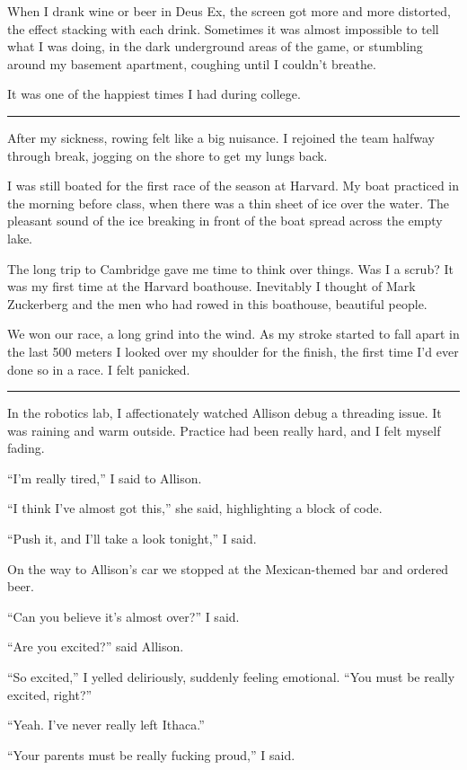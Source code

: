 When I drank wine or beer in Deus Ex, the screen got more and more distorted,
the effect stacking with each drink.  Sometimes it was almost impossible to tell
what I was doing, in the dark underground areas of the game, or stumbling around
my basement apartment, coughing until I couldn't breathe.

It was one of the happiest times I had during college.

\plainfancybreak{12pt}{2}{* * *}

After my sickness, rowing felt like a big nuisance.  I rejoined the team halfway
through break, jogging on the shore to get my lungs back.  

I was still boated for the first race of the season at Harvard.  My boat
practiced in the morning before class, when there was a thin sheet of ice over
the water.   The pleasant sound of the ice breaking in front of the boat spread
across the empty lake.
 
The long trip to Cambridge gave me time to think over things.  Was I a scrub?
It was my first time at the Harvard boathouse.  Inevitably I thought of Mark
Zuckerberg and the men who had rowed in this boathouse, beautiful people. 

We won our race, a long grind into the wind.  As my stroke started to fall apart
in the last 500 meters I looked over my shoulder for the finish, the first time
I'd ever done so in a race.  I felt panicked.

\plainfancybreak{12pt}{2}{* * *}

In the robotics lab, I affectionately watched Allison debug a threading issue.
It was raining and warm outside.  Practice had been really hard, and I felt
myself fading.

``I'm really tired,'' I said to Allison.

``I think I've almost got this,'' she said, highlighting a block of code.

``Push it, and I'll take a look tonight,'' I said.

On the way to Allison's car we stopped at the Mexican-themed bar and ordered
beer.

``Can you believe it's almost over?'' I said.

``Are you excited?'' said Allison.

``So excited,'' I yelled deliriously, suddenly feeling emotional.  ``You must be
really excited, right?''

``Yeah.  I've never really left Ithaca.''

``Your parents must be really fucking proud,'' I said.

